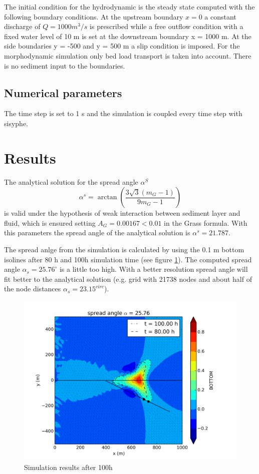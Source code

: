 The initial condition for the hydrodynamic is the steady state computed with the following boundary conditions.
At the upstream boundary $x = 0$ a constant discharge of $Q =
1000 m^3/s$ is prescribed while a free outflow condition with a fixed water level of 10 m
is set at the downstream boundary
x = 1000 m. At the side boundaries y = -500 and y = 500 m  a
slip condition is imposed.
For the morphodynamic simulation only bed load transport is taken into account. There is no sediment
input to the boundaries.


%
\subsection{Numerical parameters}
%
The time step is set to 1 s and the simulation is coupled every time step with sisyphe.


%
\section{Results}
%
The analytical solution for the spread angle $\alpha^S$
\begin{equation}
\alpha^s = \arctan (\frac{3\sqrt{3}(m_G-1)}{9m_G-1})
\end{equation}
is valid under the hypothesis of weak interaction between sediment layer
and fluid, which is ensured setting $A_G=0.00167 < 0.01$ in the Grass formula.
With this parameters the spread angle of the analytical solution is $\alpha^s=21.787$.

The spread anlge from the simulation is calculated by using the
0.1 m  bottom isolines after 80 h and 100h simulation time (see figure \ref{sis_bump-t2d}).
The computed spread angle $\alpha_s=25.76^{\circ}$ is a little too high. With a better resolution
spread angle will fit better to the analytical solution
(e.g. grid with 21738 nodes and about half of the node distances $\alpha_s=23.15^{circ}$).


\begin{figure} [!ht]
\centering
\includegraphics[scale=0.6]{../img/sis_bump2d-t2d.png}
 \caption{Simulation results after 100h}\label{sis_bump-t2d}
\end{figure}


